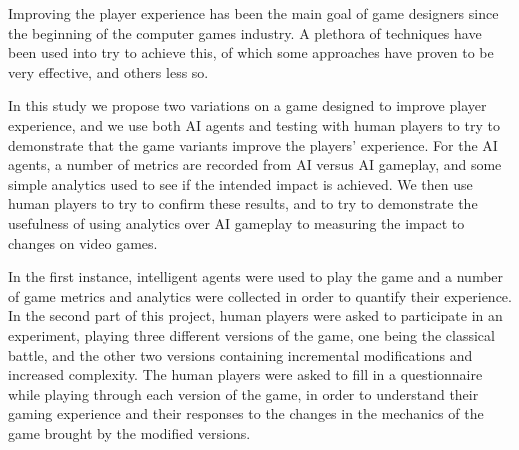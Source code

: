 Improving the player experience has been the main goal of game designers since the beginning of the computer games industry. A plethora of techniques have been used into try to achieve this, of which some approaches have proven to be very effective, and others less so.

In this study we propose two variations on a game designed to improve player experience, and we use both AI agents and testing with human players to try to demonstrate that the game variants improve the players' experience. For the AI agents, a number of metrics are recorded from AI versus AI gameplay, and some simple analytics used to see if the intended impact is achieved. We then use human players to try to confirm these results, and to try to demonstrate the usefulness of using analytics over AI gameplay to measuring the impact to changes on video games.

In the first instance, intelligent agents were used to play the game and a number of game metrics and analytics were collected in order to quantify their experience. In the second part of this project, human players were asked to participate in an experiment, playing three different versions of the game, one being the classical battle, and the other two versions containing incremental modifications and increased complexity. The human players were asked to fill in a questionnaire while playing through each version of the game, in order to understand their gaming experience and their responses to the changes in the mechanics of the game brought by the modified versions.
